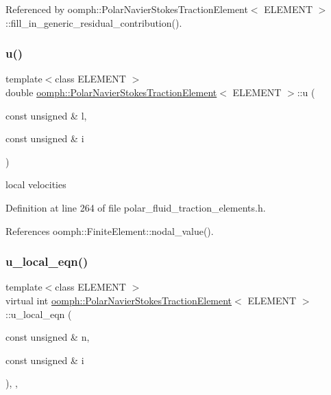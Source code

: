 Referenced by oomph\+::\+Polar\+Navier\+Stokes\+Traction\+Element$<$ E\+L\+E\+M\+E\+N\+T $>$\+::fill\+\_\+in\+\_\+generic\+\_\+residual\+\_\+contribution().

\mbox{\label{classoomph_1_1PolarNavierStokesTractionElement_aa998536fa55d84030a856e6c08efb41f}} 
\subsubsection{\texorpdfstring{u()}{u()}}
{\footnotesize\ttfamily template$<$class E\+L\+E\+M\+E\+NT $>$ \\
double \hyperlink{classoomph_1_1PolarNavierStokesTractionElement}{oomph\+::\+Polar\+Navier\+Stokes\+Traction\+Element}$<$ E\+L\+E\+M\+E\+NT $>$\+::u (\begin{DoxyParamCaption}\item[{const unsigned \&}]{l,  }\item[{const unsigned \&}]{i }\end{DoxyParamCaption})\hspace{0.3cm}{\ttfamily [inline]}}



local velocities 



Definition at line 264 of file polar\+\_\+fluid\+\_\+traction\+\_\+elements.\+h.



References oomph\+::\+Finite\+Element\+::nodal\+\_\+value().

\mbox{\label{classoomph_1_1PolarNavierStokesTractionElement_ae49f57135d1fdd4ed3e4117b4e9c5801}} 
\subsubsection{\texorpdfstring{u\+\_\+local\+\_\+eqn()}{u\_local\_eqn()}}
{\footnotesize\ttfamily template$<$class E\+L\+E\+M\+E\+NT $>$ \\
virtual int \hyperlink{classoomph_1_1PolarNavierStokesTractionElement}{oomph\+::\+Polar\+Navier\+Stokes\+Traction\+Element}$<$ E\+L\+E\+M\+E\+NT $>$\+::u\+\_\+local\+\_\+eqn (\begin{DoxyParamCaption}\item[{const unsigned \&}]{n,  }\item[{const unsigned \&}]{i }\end{DoxyParamCaption})\hspace{0.3cm}{\ttfamily [inline]}, {\ttfamily [protected]}, {\ttfamily [virtual]}}




